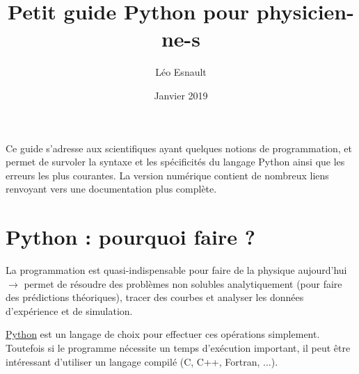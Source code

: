 \documentclass{article}
\title{Petit guide Python pour physicien-ne-s}
\author{Léo Esnault}
\date{Janvier 2019}
\begin{document}
\maketitle

Ce guide s'adresse aux scientifiques ayant quelques notions de programmation, et permet de survoler la syntaxe et les spécificités du langage Python ainsi que les erreurs les plus courantes. La version numérique contient de nombreux liens renvoyant vers une documentation plus complète.

\section{Python : pourquoi faire ?}
La programmation est quasi-indispensable pour faire de la physique aujourd'hui $\to$ permet de résoudre des problèmes non solubles analytiquement (pour faire des prédictions théoriques), tracer des courbes et analyser les données d'expérience et de simulation.

\href{https://fr.wikipedia.org/wiki/Python_(langage)}{Python} est un langage de choix pour effectuer ces opérations simplement. Toutefois si le programme nécessite un temps d'exécution important, il peut être intéressant d'utiliser un langage compilé (C, C++, Fortran, ...).
\end{document}
